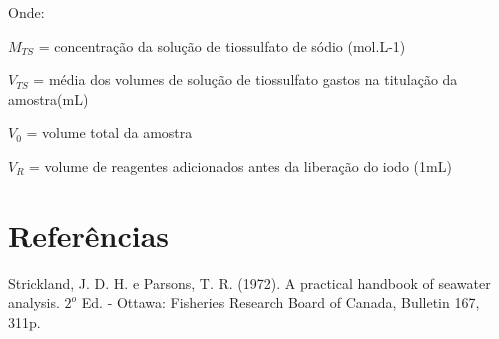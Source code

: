 \documentclass[a4paper,10pt]{SelfArx}
\begin{document}
Onde:

$M_{TS}$ = concentração da solução de tiossulfato de sódio (mol.L-1)

$V_{TS}$ = média dos volumes de solução de tiossulfato gastos na titulação da amostra(mL)

$V_0$ =  volume total da amostra

$V_R$ = volume de reagentes adicionados antes da liberação do iodo (1mL)

\section{Referências}
Strickland, J. D. H. e Parsons, T. R. (1972). A practical handbook of seawater analysis. $2^o$ Ed. - Ottawa: Fisheries Research Board of Canada, Bulletin 167, 311p.


% 
\end{document}
